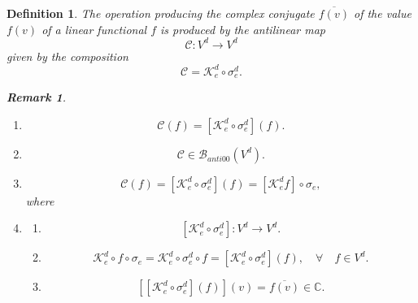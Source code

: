 \documentclass[aps,preprint]{revtex4}%
\newtheorem{definition}[theorem]{Definition}
\newtheorem{remark}[theorem]{Remark}
\begin{document}
\begin{definition}
The operation producing the complex conjugate $\overline{f\left(  v\right)  }$
of the value $f\left(  v\right)  $ of a linear functional $f$ is produced by
the antilinear map
\begin{equation}
\mathcal{C}:V^{d}\rightarrow V^{d}%
\end{equation}
given by the composition
\begin{equation}
\mathcal{C}=\mathcal{K}_{e}^{d}\circ\mathcal{\sigma}_{e}^{d}.
\end{equation}


\begin{remark}
\begin{enumerate}
\item
\begin{equation}
\mathcal{C}\left(  f\right)  =\left[  \mathcal{K}_{e}^{d}\circ\mathcal{\sigma
}_{e}^{d}\right]  \left(  f\right)  .
\end{equation}


\item
\begin{equation}
\mathcal{C\in B}_{anti00}\left(  V^{d}\right)  .
\end{equation}


\item
\begin{equation}
\mathcal{C}\left(  f\right)  =\left[  \mathcal{K}_{e}^{d}\circ\mathcal{\sigma
}_{e}^{d}\right]  \left(  f\right)  =\left[  \mathcal{K}_{e}^{d}f\right]
\circ\mathcal{\sigma}_{e},
\end{equation}
where

\item
\begin{enumerate}
\item
\begin{equation}
\left[  \mathcal{K}_{e}^{d}\circ\mathcal{\sigma}_{e}^{d}\right]
:V^{d}\rightarrow V^{d}.
\end{equation}


\item
\begin{equation}
\mathcal{K}_{e}^{d}\circ f\circ\mathcal{\sigma}_{e}=\mathcal{K}_{e}^{d}%
\circ\mathcal{\sigma}_{e}^{d}\circ f=\left[  \mathcal{K}_{e}^{d}%
\circ\mathcal{\sigma}_{e}^{d}\right]  \left(  f\right)  ,\quad\forall\quad
f\in V^{d}.
\end{equation}


\item
\begin{equation}
\left[  \left[  \mathcal{K}_{e}^{d}\circ\mathcal{\sigma}_{e}^{d}\right]
\left(  f\right)  \right]  \left(  v\right)  =\overline{f\left(  v\right)
}\in\mathbb{C}.
\end{equation}

\end{enumerate}
\end{enumerate}
\end{remark}
\end{definition}
\end{document}
